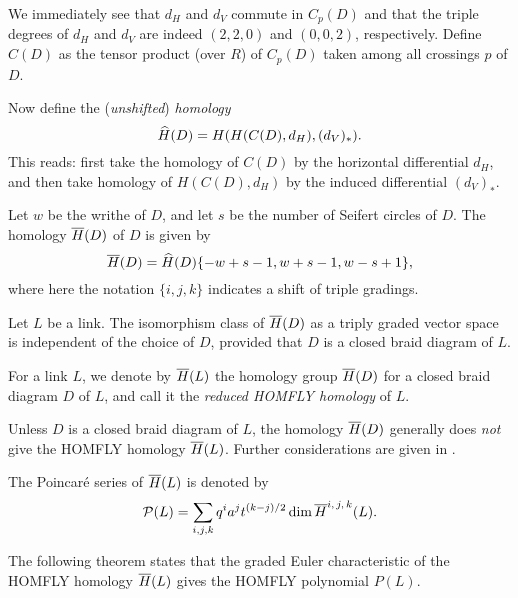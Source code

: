 We immediately see that $d_H$ and $d_V$ commute in $C_p(D)$ and that the triple degrees of $d_H$ and $d_V$ are indeed $(2,2,0)$ and $(0,0,2)$, respectively.  
Define $C(D)$ as the tensor product (over $R$) of $C_p(D)$ taken among all crossings $p$ of $D$.

Now define the (\textit{unshifted}) \textit{homology}
\[
    \widehat{H}(D) = H(H(C(D), d_H), (d_V)_*).
\]
This reads: first take the homology of $C(D)$ by the horizontal differential $d_H$, and then take homology of $H(C(D), d_H)$ by the induced differential $(d_V)_*$. 

\begin{definition}
    Let $w$ be the writhe of $D$, and let $s$ be the number of Seifert circles of $D$.
    The homology $\overline{H}(D)$ of $D$ is given by
    \begin{equation} \label{eq:Hbar-def}
        \overline{H}(D) = \widehat{H}(D)\{-w+s-1,w+s-1,w-s+1\},
    \end{equation}
    where here the notation $\{i, j, k\}$ indicates a shift of triple gradings.
\end{definition}

\begin{theorem}
    Let $L$ be a link. The isomorphism class of $\overline{H}(D)$ as a triply graded vector space is independent of the choice of $D$, provided that $D$ is a closed braid diagram of $L$.
\end{theorem}

\begin{definition}
    For a link $L$, 
    we denote by $\overline{H}(L)$ the homology group $\overline{H}(D)$ for a closed braid diagram $D$ of $L$, and call it the \textit{reduced HOMFLY homology} of $L$.
\end{definition}

\begin{remark}\label{rem:generaldiag}
    Unless $D$ is a closed braid diagram of $L$, the homology $\overline{H}(D)$ generally does \textit{not} give the HOMFLY homology $\overline{H}(L)$.
    Further considerations are given in . 
\end{remark}

\begin{definition}
    The Poincar\'e series of $\overline{H}(L)$ is denoted by
    \[
        \mathcal{P}(L) = \sum_{i,j,k} q^ia^jt^{(k-j)/2}\dim \overline{H}^{i,\,j,\,k}(L).
    \]
\end{definition}

The following theorem states that the graded Euler characteristic of the HOMFLY homology $\overline{H}(L)$ gives the HOMFLY polynomial $P(L)$. 

